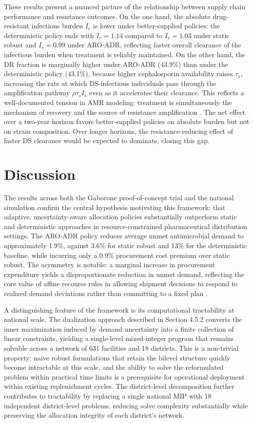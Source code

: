 \documentclass{article}
\begin{document}
These results present a nuanced picture of the relationship between supply chain performance and resistance outcomes. On the one hand, the absolute drug-resistant infectious burden $I_r$ is lower under better-supplied policies: the deterministic policy ends with $I_r = 1.14$ compared to $I_r = 1.03$ under static robust and $I_r = 0.99$ under ARO-ADR, reflecting faster overall clearance of the infectious burden when treatment is reliably maintained. On the other hand, the DR fraction is marginally higher under ARO-ADR (43.9\%) than under the deterministic policy (43.1\%), because higher cephalosporin availability raises $\tau_s$, increasing the rate at which DS-infectious individuals pass through the amplification pathway $\rho \tau_s I_s$ even as it accelerates their clearance. This reflects a well-documented tension in AMR modeling: treatment is simultaneously the mechanism of recovery and the source of resistance amplification \cite{kd20}. The net effect over a two-year horizon favors better-supplied policies on absolute burden but not on strain composition. Over longer horizons, the resistance-reducing effect of faster DS clearance would be expected to dominate, closing this gap.

\section{Discussion}

The results across both the Gaborone proof-of-concept trial and the national simulation confirm the central hypothesis motivating this framework: that adaptive, uncertainty-aware allocation policies substantially outperform static and deterministic approaches in resource-constrained pharmaceutical distribution settings. The ARO-ADR policy reduces average unmet antimicrobial demand to approximately 1.9\%, against 3.6\% for static robust and 13\% for the deterministic baseline, while incurring only a 0.9\% procurement cost premium over static robust. The asymmetry is notable: a marginal increase in procurement expenditure yields a disproportionate reduction in unmet demand, reflecting the core value of affine recourse rules in allowing shipment decisions to respond to realized demand deviations rather than committing to a fixed plan \cite{yanikoglu2018aro}.

A distinguishing feature of the framework is its computational tractability at national scale. The dualization approach described in Section 4.5.2 converts the inner maximization induced by demand uncertainty into a finite collection of linear constraints, yielding a single-level mixed-integer program that remains solvable across a network of 631 facilities and 18 districts. This is a non-trivial property: naive robust formulations that retain the bilevel structure quickly become intractable at this scale, and the ability to solve the reformulated problem within practical time limits is a prerequisite for operational deployment within existing replenishment cycles. The district-level decomposition further contributes to tractability by replacing a single national MIP with 18 independent district-level problems, reducing solve complexity substantially while preserving the allocation integrity of each district's network.
\end{document}
